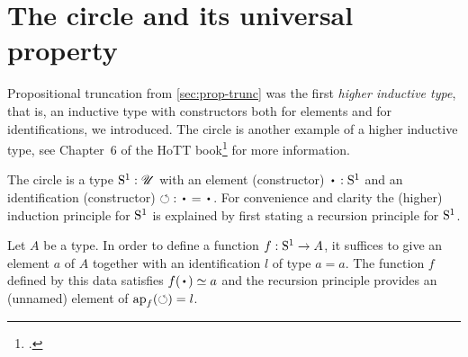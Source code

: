 \section{The circle and its universal property}
\label{sec:S1}

Propositional truncation from \cref{sec:prop-trunc} was
the first \emph{higher inductive type}, that is, an inductive type
with constructors both for elements and for identifications,
we introduced. 
The circle is another example of a higher inductive type,
see Chapter~6 of the HoTT book\footcite{hottbook} for more information.

\begin{definition}
  \label{def:circle}
The circle is a type ${\mathrm{S}^1}:{\mathscr{U}}$ with an element (constructor) $\base : \Sc$ and 
an identification (constructor) ${\Sloop}: \base=\base$. For convenience and
clarity the (higher) induction principle for ${\mathrm{S}^1}$ is explained
by first stating a recursion principle for ${\mathrm{S}^1}$.

Let $A$ be a type. In order to define a function $f:{\mathrm{S}^1}\to A$,
it suffices to give an element $a$ of $A$ together with an
identification $l$ of type $a=a$. The function $f$ defined
by this data satisfies $f(\base)\jdeq a$ and 
the recursion principle provides an (unnamed) element of 
$\ap{f}(\Sloop)=l$.


\end{definition}
